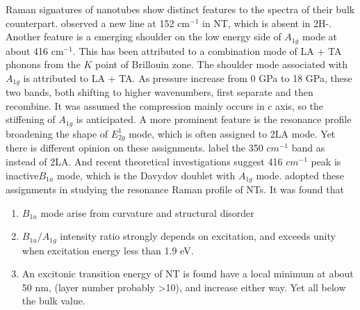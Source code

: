 Raman signatures of  nanotubes show distinct features to the spectra of their bulk counterpart. \citeauthor{JMR7990865} observed a new line at 152 cm$^{-1}$ in  NT, which is absent in 2H-.\cite{JMR7990865} Another feature is a emerging shoulder on the low energy side of $A_{1g}$ mode at about 416 cm$^{-1}$. This has been attributed to a combination mode of LA + TA phonons from the $K$ point of Brillouin zone.\cite{Sourisseau1991} The shoulder mode associated with $A_{1g}$ is attributed to LA + TA. As pressure increase from 0 GPa to 18 GPa, these two bands, both shifting to higher wavenumbers, first separate and then recombine. It was assumed the compression mainly occurs in $c$ axis, so the stiffening of $A_{1g}$ is anticipated. A more prominent feature is the resonance profile broadening the shape of $E_{2g}^1$ mode, which is often assigned to 2LA mode. Yet there is different opinion on these assignments. \citeauthor{Molina-Sanchez2011} label the 350 $cm^{-1}$ band as  instead of 2LA.\cite{Molina-Sanchez2011} And recent theoretical investigations suggest 416 $cm^{-1}$ peak is inactive$B_{1u}$ mode\cite{Molina-Sanchez2011,Ataca2012}, which is the Davydov doublet with $A_{1g}$ mode. \citeauthor{Staiger2012} adopted these assignments in studying the resonance Raman profile of  NTs.\cite{Staiger2012} It was found that
\begin{enumerate}
\item $B_{1u}$ mode arise from curvature and structural disorder
\item $B_{1u}/A_{1g}$ intensity ratio strongly depends on excitation, and exceeds unity when excitation energy less than 1.9 eV.
\item  An excitonic transition energy of NT is found have a local minimum at about 50 nm, (layer number probably \textgreater 10), and increase either way. Yet all below the bulk value.
\end{enumerate}

